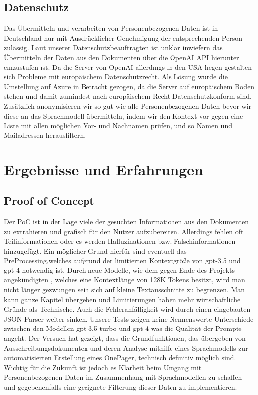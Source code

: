 \subsection{Datenschutz}
Das Übermitteln und verarbeiten von Personenbezogenen Daten ist in Deutschland nur mit Ausdrücklicher Genehmigung der
entsprechenden Person zulässig. Laut unserer Datenschutzbeauftragten ist unklar inwiefern das Übermitteln der Daten aus
den Dokumenten über die OpenAI API hierunter einzustufen ist. Da die Server von OpenAI allerdings in den USA liegen
gestalten sich Probleme mit europäischem Datenschutzrecht. Als Lösung wurde die Umstellung auf Azure in Betracht
gezogen, da die Server auf europäischem Boden stehen und damit zumindest nach europäischem Recht Datenschutzkonform
sind. Zusätzlich anonymisieren wir so gut wie alle Personenbezogenen Daten bevor wir diese an das Sprachmodell
übermitteln, indem wir den Kontext vor gegen eine Liste mit allen möglichen Vor- und Nachnamen prüfen, 
und so Namen und Mailadressen herausfiltern.


\section{Ergebnisse und Erfahrungen}

\subsection{Proof of Concept}

Der PoC ist in der Lage viele der gesuchten Informationen aus den Dokumenten zu extrahieren und grafisch für den Nutzer
aufzubereiten. Allerdings fehlen oft Teilinformationen oder es werden Halluzinationen bzw. Falschinformationen
hinzugefügt. Ein möglicher Grund hierfür sind eventuell das PreProcessing,welches aufgrund der limitierten Kontextgröße
von gpt-3.5 und gpt-4 notwendig ist. Durch neue Modelle, wie dem gegen Ende des Projekts angekündigten
\textcite{gpt-4-turbo}, welches eine Kontextlänge von 128K Tokens besitzt, wird man nicht länger gezwungen sein sich auf
kleine Textausschnitte zu begrenzen. Man kann ganze Kapitel übergeben und Limitierungen haben mehr wirtschaftliche
Gründe als Technische. Auch die Fehleranfälligkeit wird durch einen eingebauten JSON-Parser weiter sinken. Unsere Tests
zeigen keine Nennenswerte Unterschiede zwischen den Modellen gpt-3.5-turbo und gpt-4 was die Qualität der Prompts
angeht. Der Versuch hat gezeigt, dass die Grundfunktionen, das übergeben von Ausschreibungsdokumenten und deren Analyse
mithilfe eines Sprachmodells zur automatisierten Erstellung eines OnePager, technisch definitiv möglich sind. Wichtig
für die Zukunft ist jedoch es Klarheit beim Umgang mit Personenbezogenen Daten im Zusammenhang mit Sprachmodellen zu
schaffen und gegebenenfalls eine geeignete Filterung dieser Daten zu implementieren.

